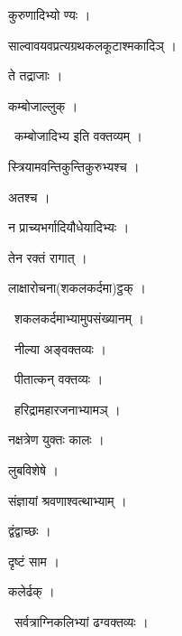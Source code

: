 \documentclass[10pt, openany, oneside]{book}
\begin{document}
\noindent कुरुणादिभ्यो ण्यः ।

\noindent साल्वावयवप्रत्यग्रथकलकूटाश्मकादिञ् ।

\noindent ते तद्राजाः ।

\noindent कम्बोजाल्लुक् ।

\par\noindent\hspace{1.5em}{\vps वा॰}~{\qt कम्बोजादिभ्य इति वक्तव्यम् ।}

\noindent स्त्रियामवन्तिकुन्तिकुरुभ्यश्च ।

\noindent अतश्च ।

\noindent न प्राच्यभर्गादियौधेयादिभ्यः ।

\noindent तेन रक्तं रागात् ।

\noindent लाक्षारोचना(शकलकर्दमा)ट्ठक् ।

\par\noindent\hspace{1.5em}{\vps वा॰}~{\qt शकलकर्दमाभ्यामुपसंख्यानम् ।}

\par\noindent\hspace{1.5em}{\vps वा॰}~{\qt नील्या अङ्वक्तव्यः ।}

\par\noindent\hspace{1.5em}{\vps वा॰}~{\qt पीतात्कन् वक्तव्यः ।}

\par\noindent\hspace{1.5em}{\vps वा॰}~{\qt हरिद्रामहारजनाभ्यामञ् ।}

\noindent नक्षत्रेण युक्तः कालः ।

\noindent लुबविशेषे ।

\noindent संज्ञायां श्रवणाश्वत्थाभ्याम् ।

\noindent द्वंद्वाच्छः ।

\noindent दृष्टं साम ।

\noindent कलेर्ढक् ।

\par\noindent\hspace{1.5em}{\vps वा॰}~{\qt सर्वत्राग्निकलिभ्यां ढग्वक्तव्यः ।}
\end{document}
